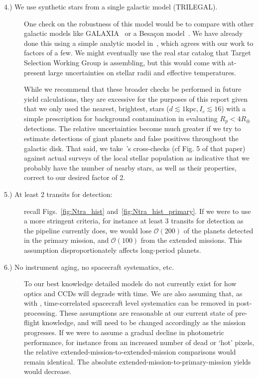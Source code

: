 \begin{description}
	
	\item[4.) We use synthetic stars from a single galactic model (TRILEGAL).]
	One check on the robustness of this model would be to compare with other galactic models like GALAXIA~\citep{sharma_galaxia_2011} or a Besa\c con model~\citep{robin2003synthetic}.
	We have already done this using a simple analytic model in~\citet{winn_searchable_2013}, which agrees with our work to factors of a few.
	We might eventually use the real star catalog that \tesss Target Selection Working Group is assembling, but this would come with at-present large uncertainties on stellar radii and effective temperatures.
	
	While we recommend that these broader checks be performed in future \tess yield calculations, they are excessive for the purposes of this report given that we only used the nearest, brightest, stars ($d\lesssim\mathrm{1kpc}, I_c\lesssim16$) with a simple prescription for background contamination in evaluating \tesss $R_p<4R_\oplus$ detections.
	The relative uncertainties become much greater if we try to estimate detections of giant planets and false positives throughout the galactic disk.
	That said, we take~'s cross-checks (cf Fig. 5 of that paper) against actual surveys of the local stellar population as indicative that we probably have the number of nearby stars, as well as their properties, correct to our desired factor of 2.
	
	
	\item[5.) At least 2 transits for detection:] recall Figs.~\ref{fig:Ntra_hist} and~\ref{fig:Ntra_hist_primary}.
	If we were to use a more stringent criteria, for instance at least 3 transits for detection as the \kepler pipeline currently does, we would lose $\mathcal{O}(200)$ of the planets detected in the primary mission, and $\mathcal{O}(100)$ from the extended missions.
	This assumption disproportionately affects long-period planets.
	
	
	
	\item[6.) No instrument aging, no spacecraft systematics, etc.]
	To our best knowledge detailed models do not currently exist for how \tesss optics and CCDs will degrade with time.
	We are also assuming that, as with \ktwo, time-correlated spacecraft level systematics can be removed in post-processing.
	These assumptions are reasonable at our current state of pre-flight knowledge, and will need to be changed accordingly as the mission progresses.
	If we were to assume a gradual decline in photometric performance, for instance from an increased number of dead or `hot' pixels, the relative extended-mission-to-extended-mission comparisons would remain identical.
	The absolute extended-mission-to-primary-mission yields would decrease.
	

\end{description}
